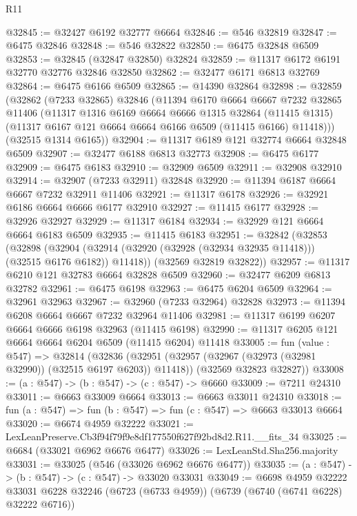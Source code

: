 \begin{lexlean}{R11}
\begin{coremodule}
@32845 := @32427 @6192 @32777 @6664
@32846 := @546 @32819
@32847 := @6475 @32846
@32848 := @546 @32822
@32850 := @6475 @32848 @6509
@32853 := @32845 (@32847 @32850) @32824
@32859 := @11317 @6172 @6191 @32770 @32776 @32846 @32850
@32862 := @32477 @6171 @6813 @32769
@32864 := @6475 @6166 @6509
@32865 := @14390 @32864
@32898 := @32859
    (@32862
      (@7233 @32865)
      @32846
      (@11394
        @6170
        @6664
        @6667
        @7232
        @32865
        @11406
        (@11317
          @1316
          @6169
          @6664
          @6666
          @1315
          @32864
          (@11415 @1315)
          (@11317 @6167 @121 @6664 @6664 @6166 @6509 (@11415 @6166) @11418)))
      (@32515 @1314 @6165))
@32904 := @11317 @6189 @121 @32774 @6664 @32848 @6509
@32907 := @32477 @6188 @6813 @32773
@32908 := @6475 @6177
@32909 := @6475 @6183
@32910 := @32909 @6509
@32911 := @32908 @32910
@32914 := @32907 (@7233 @32911) @32848
@32920 := @11394 @6187 @6664 @6667 @7232 @32911 @11406
@32921 := @11317 @6178
@32926 := @32921 @6186 @6664 @6666 @6177 @32910
@32927 := @11415 @6177
@32928 := @32926 @32927
@32929 := @11317 @6184
@32934 := @32929 @121 @6664 @6664 @6183 @6509
@32935 := @11415 @6183
@32951 := @32842
    (@32853
      (@32898
        (@32904 (@32914 (@32920 (@32928 (@32934 @32935 @11418))) (@32515 @6176 @6182)) @11418))
      (@32569 @32819 @32822))
@32957 := @11317 @6210 @121 @32783 @6664 @32828 @6509
@32960 := @32477 @6209 @6813 @32782
@32961 := @6475 @6198
@32963 := @6475 @6204 @6509
@32964 := @32961 @32963
@32967 := @32960 (@7233 @32964) @32828
@32973 := @11394 @6208 @6664 @6667 @7232 @32964 @11406
@32981 := @11317 @6199 @6207 @6664 @6666 @6198 @32963 (@11415 @6198)
@32990 := @11317 @6205 @121 @6664 @6664 @6204 @6509 (@11415 @6204) @11418
@33005 := fun (value : @547) =>
  @32814
    (@32836
      (@32951 (@32957 (@32967 (@32973 (@32981 @32990)) (@32515 @6197 @6203)) @11418))
      (@32569 @32823 @32827))
@33008 := (a : @547) -> (b : @547) -> (c : @547) -> @6660
@33009 := @7211 @24310
@33011 := @6663 @33009 @6664
@33013 := @6663 @33011 @24310
@33018 := fun (a : @547) => fun (b : @547) => fun (c : @547) => @6663 @33013 @6664
@33020 := @6674 @4959 @32222
@33021 := LexLeanPreserve.Cb3f94f79f9e8df177550f627f92bd8d2.R11.__fits_34
@33025 := @6684 (@33021 @6962 @6676 @6477)
@33026 := LexLeanStd.Sha256.majority
@33031 := @33025 (@546 (@33026 @6962 @6676 @6477))
@33035 := (a : @547) -> (b : @547) -> (c : @547) -> @33020 @33031
@33049 := @6698
    @4959
    @32222
    @33031
    @6228
    @32246
    (@6723 (@6733 @4959))
    (@6739 (@6740 (@6741 @6228) @32222 @6716))

\end{coremodule}
\end{lexlean}
